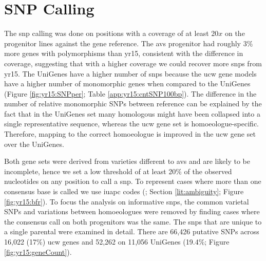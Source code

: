 \section{SNP Calling}
\label{yr15:snpCalling}

The \gls{snp} calling was done on positions with a coverage of at least $20x$ on the progenitor lines against the gene reference. The \gls{avs} progenitor had roughly $3\%$ more genes with polymorphisms than \gls{yr15}, consistent with the difference in coverage, suggesting that with a higher coverage we could recover more \gls{snp}s from \gls{yr15}.
The UniGenes have a higher number of \gls{snp}s because the \gls{ucw} gene models have a higher number of monomorphic genes when compared to the UniGenes (Figure \ref{fig:yr15:SNPper}; Table \ref{app:yr15:cntSNP100bp}). 
The difference in the number of relative monomorphic SNPs between reference can be explained by the fact that in the UniGenes set many homologous might have been collapsed into a single representative sequence, whereas the \acrshort{ucw} gene set is homoeologue-specific.
Therefore, mapping to the correct homoeologue is improved in the \acrshort{ucw} gene set over the UniGenes.





Both gene sets were derived from varieties different to \gls{avs} and are likely to be incomplete, hence we set a low threshold of at least 20\% of the observed nucleotides on any position to call a \gls{snp}. 
To represent cases where more than one consensus base is called we use \gls{iuapc} codes (\citet{Cornish-Bowden1985}; Section \ref{lit:ambiguity}; Figure \ref{fig:yr15:bfr}).  
To focus the analysis on informative \gls{snp}s, the common varietal SNPs and variations between homoeologues were removed by finding cases where the consensus call on both progenitors was the same. 
The \gls{snp}s that are unique to a single parental were examined in detail. 
There are 66,426 putative SNPs across 16,022 (17\%) \gls{ucw} genes and 52,262  on 11,056 UniGenes (19.4\%; Figure \ref{fig:yr15:geneCount}).  

